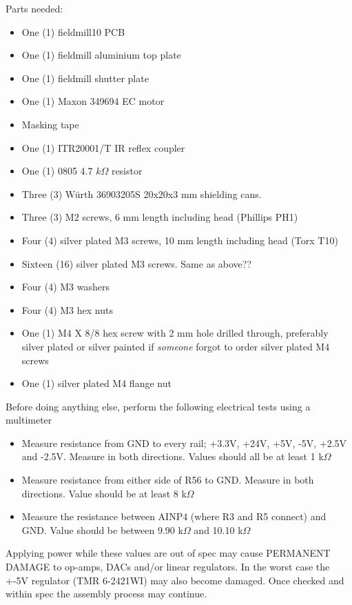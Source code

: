 \documentclass{article}
\begin{document}
Parts needed:

\begin{itemize}
\item One (1) fieldmill10 PCB
\item One (1) fieldmill aluminium top plate
\item One (1) fieldmill shutter plate
\item One (1) Maxon 349694 EC motor
\item Masking tape
\item One (1) ITR20001/T IR reflex coupler
\item One (1) 0805 4.7 $k\Omega$ resistor
\item Three (3) Würth 36903205S 20x20x3 mm shielding cans.
\item Three (3) M2 screws, 6 mm length including head (Phillips PH1)
\item Four (4) silver plated M3 screws, 10 mm length including head (Torx T10)
\item Sixteen (16) silver plated M3 screws. Same as above??
\item Four (4) M3 washers
\item Four (4) M3 hex nuts
\item One (1) M4 X 8/8 hex screw with 2 mm hole drilled through, preferably silver plated or silver painted if {\it someone} forgot to order silver plated M4 screws
\item One (1) silver plated M4 flange nut
\end{itemize}

Before doing anything else, perform the following electrical tests using a multimeter

\begin{itemize}
\item Measure resistance from GND to every rail; +3.3V, +24V, +5V, -5V, +2.5V and -2.5V. Measure in both directions. Values should all be at least 1 k$\Omega$
\item Measure resistance from either side of R56 to GND. Measure in both directions. Value should be at least 8 k$\Omega$
\item Measure the resistance between AINP4 (where R3 and R5 connect) and GND. Value should be between 9.90 k$\Omega$ and 10.10 k$\Omega$
\end{itemize}

Applying power while these values are out of spec may cause PERMANENT DAMAGE to op-amps, DACs and/or linear regulators.
In the worst case the +-5V regulator (TMR 6-2421WI) may also become damaged.
Once checked and within spec the assembly process may continue.
\end{document}

